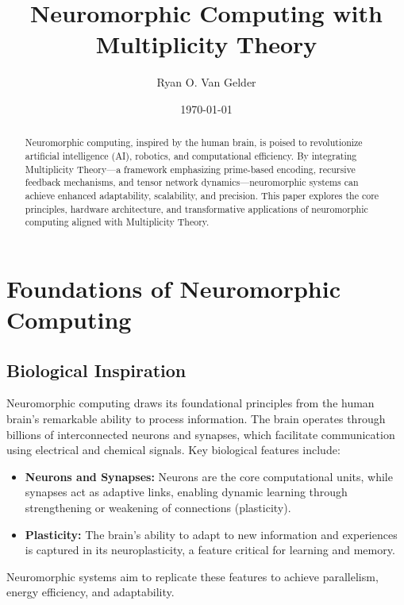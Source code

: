 \documentclass{article}
\theoremstyle{plain}
\begin{document}
\title{Neuromorphic Computing with Multiplicity Theory}

\author{Ryan O. Van Gelder}
\date{\today}

\maketitle

\begin{abstract}
Neuromorphic computing, inspired by the human brain, is poised to revolutionize artificial intelligence (AI), robotics, and computational efficiency. By integrating Multiplicity Theory—a framework emphasizing prime-based encoding, recursive feedback mechanisms, and tensor network dynamics—neuromorphic systems can achieve enhanced adaptability, scalability, and precision. This paper explores the core principles, hardware architecture, and transformative applications of neuromorphic computing aligned with Multiplicity Theory.
\end{abstract}

\section{Foundations of Neuromorphic Computing}

\subsection{Biological Inspiration}
Neuromorphic computing draws its foundational principles from the human brain's remarkable ability to process information. The brain operates through billions of interconnected neurons and synapses, which facilitate communication using electrical and chemical signals. Key biological features include:
\begin{itemize}
    \item \textbf{Neurons and Synapses:} Neurons are the core computational units, while synapses act as adaptive links, enabling dynamic learning through strengthening or weakening of connections (plasticity).
    \item \textbf{Plasticity:} The brain's ability to adapt to new information and experiences is captured in its neuroplasticity, a feature critical for learning and memory.
\end{itemize}
Neuromorphic systems aim to replicate these features to achieve parallelism, energy efficiency, and adaptability.
\end{document}
